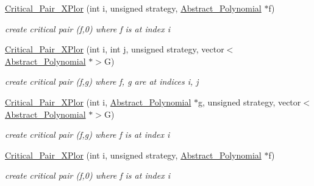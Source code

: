 \begin{Indent}
\begin{DoxyCompactItemize}
\hyperlink{class_critical___pair___x_plor_ac1564546db9b4736444a614970c1796d}{Critical\+\_\+\+Pair\+\_\+\+X\+Plor} (int i, unsigned strategy, \hyperlink{class_abstract___polynomial}{Abstract\+\_\+\+Polynomial} $\ast$f)
\begin{DoxyCompactList}\small\item\em create critical pair (f,0) where f is at index {\ttfamily i} \end{DoxyCompactList}\item 
\mbox{\label{class_critical___pair___x_plor_af5d0947e70b4070f796f1b0d8ce75484}} 
\hyperlink{class_critical___pair___x_plor_af5d0947e70b4070f796f1b0d8ce75484}{Critical\+\_\+\+Pair\+\_\+\+X\+Plor} (int i, int j, unsigned strategy, vector$<$ \hyperlink{class_abstract___polynomial}{Abstract\+\_\+\+Polynomial} $\ast$$>$G)
\begin{DoxyCompactList}\small\item\em create critical pair (f,g) where f, g are at indices {\ttfamily i}, {\ttfamily j} \end{DoxyCompactList}\item 
\mbox{\label{class_critical___pair___x_plor_a1cafe8e84ec3bee5e63370b7b815ba71}} 
\hyperlink{class_critical___pair___x_plor_a1cafe8e84ec3bee5e63370b7b815ba71}{Critical\+\_\+\+Pair\+\_\+\+X\+Plor} (int i, \hyperlink{class_abstract___polynomial}{Abstract\+\_\+\+Polynomial} $\ast$g, unsigned strategy, vector$<$ \hyperlink{class_abstract___polynomial}{Abstract\+\_\+\+Polynomial} $\ast$$>$G)
\begin{DoxyCompactList}\small\item\em create critical pair (f,g) where f is at index {\ttfamily i} \end{DoxyCompactList}\item 
\mbox{\label{class_critical___pair___x_plor_ac1564546db9b4736444a614970c1796d}} 
\hyperlink{class_critical___pair___x_plor_ac1564546db9b4736444a614970c1796d}{Critical\+\_\+\+Pair\+\_\+\+X\+Plor} (int i, unsigned strategy, \hyperlink{class_abstract___polynomial}{Abstract\+\_\+\+Polynomial} $\ast$f)
\begin{DoxyCompactList}\small\item\em create critical pair (f,0) where f is at index {\ttfamily i} \end{DoxyCompactList}\item 

\end{DoxyCompactItemize}
\end{Indent}
